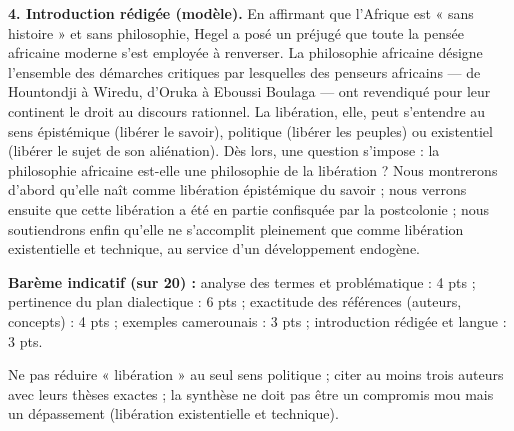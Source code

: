 \documentclass[11pt]{article}
\begin{document}
\begin{corrige}
\textbf{4. Introduction rédigée (modèle).} En affirmant que l'Afrique est « sans histoire » et sans philosophie, Hegel a posé un préjugé que toute la pensée africaine moderne s'est employée à renverser. La philosophie africaine désigne l'ensemble des démarches critiques par lesquelles des penseurs africains — de Hountondji à Wiredu, d'Oruka à Eboussi Boulaga — ont revendiqué pour leur continent le droit au discours rationnel. La libération, elle, peut s'entendre au sens épistémique (libérer le savoir), politique (libérer les peuples) ou existentiel (libérer le sujet de son aliénation). Dès lors, une question s'impose : la philosophie africaine est-elle une philosophie de la libération ? Nous montrerons d'abord qu'elle naît comme libération épistémique du savoir ; nous verrons ensuite que cette libération a été en partie confisquée par la postcolonie ; nous soutiendrons enfin qu'elle ne s'accomplit pleinement que comme libération existentielle et technique, au service d'un développement endogène.

\textbf{Barème indicatif (sur 20) :} analyse des termes et problématique : 4 pts ; pertinence du plan dialectique : 6 pts ; exactitude des références (auteurs, concepts) : 4 pts ; exemples camerounais : 3 pts ; introduction rédigée et langue : 3 pts.
\end{corrige}

\begin{attention}
Ne pas réduire « libération » au seul sens politique ; citer au moins trois auteurs avec leurs thèses exactes ; la synthèse ne doit pas être un compromis mou mais un dépassement (libération existentielle et technique).
\end{attention}
\end{document}
